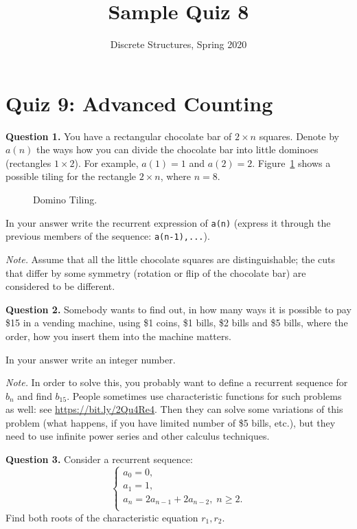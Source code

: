 \documentclass[jou]{apa6}
\title{Sample Quiz 8}
\author{Discrete Structures, Spring 2020}
\affiliation{RBS}
\begin{document}

\twocolumn
\section{Quiz 9: Advanced Counting}

\vspace{10pt}
{\bf Question 1.} 
You have a rectangular chocolate bar of $2 \times n$ squares. 
Denote by $a(n)$ the ways how you can divide the chocolate bar into 
little dominoes (rectangles $1 \times 2$). 
For example, $a(1) = 1$ and $a(2) = 2$. 
Figure~\ref{fig:domino-tiling} shows a possible tiling for 
the rectangle $2 \times n$, where $n=8$.

\begin{figure}[!htb]
\caption{\label{fig:domino-tiling} Domino Tiling.}
\end{figure}


In your answer write the recurrent expression of {\tt a(n)} (express it through the previous members
of the sequence: {\tt a(n-1),...}).

{\em Note.} Assume that all the little
chocolate squares are distinguishable; the cuts that differ by 
some symmetry (rotation or flip of the chocolate bar) are considered to be different.


\vspace{10pt}
{\bf Question 2.}
Somebody wants to find out, in how many ways it is possible to pay \$15 in a vending machine, using 
\$1 coins, \$1 bills, \$2 bills and \$5 bills, where the order, how you insert them into the machine matters.

In your answer write an integer number.

{\em Note.} In order to solve this, you probably want to define a 
recurrent sequence for $b_n$ and 
find $b_{15}$. People sometimes use characteristic functions for such problems as well:
see \url{https://bit.ly/2Qu4Re4}. Then they can solve some variations of this
problem (what happens, if you have limited number of \$5 bills, etc.), but they need to use
infinite power series and other calculus techniques.

\vspace{10pt}
{\bf Question 3.}
Consider a recurrent sequence: 
$$\left\{ \begin{array}{l}
a_0 = 0,\\
a_1 = 1, \\
a_n = 2a_{n-1} + 2a_{n-2},\;n\geq 2.\\
\end{array} \right.$$
Find both roots of the characteristic equation $r_1,r_2$. 
\end{document}

